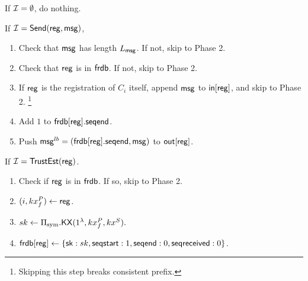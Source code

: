 If $\mathcal{I} = \emptyset$, do nothing. 

If $\mathcal{I} = \mathsf{Send}(\mathsf{reg}, \mathsf{msg})$, 

\begin{enumerate}
    \item Check that $\mathsf{msg}$ has length $L_{\mathsf{msg}}$. If not, skip to Phase 2.
    \item Check that $\mathsf{reg}$ is in $\mathsf{frdb}$. If not, skip to Phase 2.
    \item If $\mathsf{reg}$ is the registration of $C_i$ itself, append $\mathsf{msg}$ to $\mathsf{in}[\mathsf{reg}]$, and skip to Phase 2. \footnote{Skipping this step breaks consistent prefix.}
    \item Add $1$ to $\mathsf{frdb}[\mathsf{reg}].\mathsf{seqend}$. 
    \item Push $\mathsf{msg}^{lb} = (\mathsf{frdb}[\mathsf{reg}].\mathsf{seqend}, \mathsf{msg})$ to $\mathsf{out}[\mathsf{reg}]$.
\end{enumerate}

If $\mathcal{I} = \mathsf{TrustEst}(\mathsf{reg})$.
\begin{enumerate}
    \item Check if $\mathsf{reg}$ is in $\mathsf{frdb}$. If so, skip to Phase 2.
    \item $(i, kx_f^P) \leftarrow \mathsf{reg}$.
    \item $sk \leftarrow \Pi_{\text{sym}}.\mathsf{KX}(1^{\lambda}, kx_f^P, kx^S).$
    \item $\mathsf{frdb}[\mathsf{reg}] \leftarrow \{{\mathsf{sk}}: sk,  \mathsf{seqstart}: 1, \mathsf{seqend}: 0, \mathsf{seqreceived}: 0\}$.
\end{enumerate}

